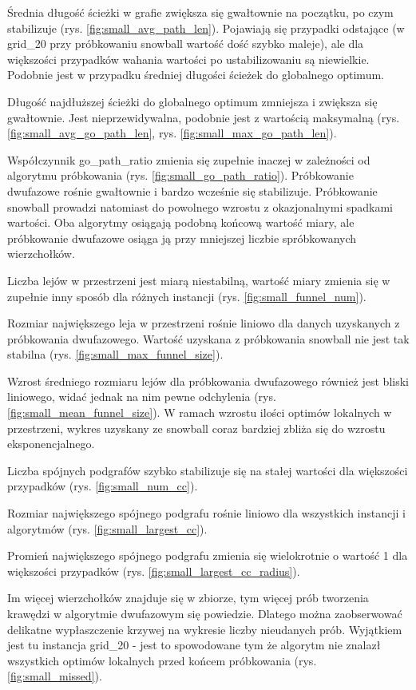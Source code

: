 Średnia długość ścieżki w grafie zwiększa się gwałtownie na początku, po czym stabilizuje (rys. \ref{fig:small_avg_path_len}).
Pojawiają się przypadki odstające (w grid\_20 przy próbkowaniu snowball wartość dość szybko maleje),
ale dla większości przypadków wahania wartości po ustabilizowaniu są niewielkie.
Podobnie jest w przypadku średniej długości ścieżek do globalnego optimum.

Długość najdłuższej ścieżki do globalnego optimum zmniejsza i zwiększa się gwałtownie.
Jest nieprzewidywalna, podobnie jest z wartością maksymalną (rys. \ref{fig:small_avg_go_path_len}, rys. \ref{fig:small_max_go_path_len}).

Współczynnik go\_path\_ratio zmienia się zupełnie inaczej w zależności od algorytmu próbkowania (rys. \ref{fig:small_go_path_ratio}).
Próbkowanie dwufazowe rośnie gwałtownie i bardzo wcześnie się stabilizuje.
Próbkowanie snowball prowadzi natomiast do powolnego wzrostu z okazjonalnymi spadkami wartości.
Oba algorytmy osiągają podobną końcową wartość miary, ale próbkowanie dwufazowe osiąga ją przy mniejszej
liczbie spróbkowanych wierzchołków.

Liczba lejów w przestrzeni jest miarą niestabilną, wartość miary zmienia się w zupełnie inny sposób
dla różnych instancji (rys. \ref{fig:small_funnel_num}).

Rozmiar największego leja w przestrzeni rośnie liniowo dla danych uzyskanych z próbkowania
dwufazowego. Wartość uzyskana z próbkowania snowball nie jest tak stabilna (rys. \ref{fig:small_max_funnel_size}).

Wzrost średniego rozmiaru lejów dla próbkowania dwufazowego również jest bliski liniowego,
widać jednak na nim pewne odchylenia (rys. \ref{fig:small_mean_funnel_size}). W ramach wzrostu ilości optimów lokalnych w przestrzeni,
wykres uzyskany ze snowball coraz bardziej zbliża się do wzrostu eksponencjalnego.

Liczba spójnych podgrafów szybko stabilizuje się na stałej wartości dla większości przypadków (rys. \ref{fig:small_num_cc}).

Rozmiar największego spójnego podgrafu rośnie liniowo dla wszystkich instancji i algorytmów (rys. \ref{fig:small_largest_cc}).

Promień największego spójnego podgrafu zmienia się wielokrotnie o wartość 1 dla większości przypadków (rys. \ref{fig:small_largest_cc_radius}).

Im więcej wierzchołków znajduje się w zbiorze, tym więcej prób tworzenia krawędzi w algorytmie dwufazowym
się powiedzie. Dlatego można zaobserwować delikatne wypłaszczenie krzywej na wykresie liczby nieudanych prób.
Wyjątkiem jest tu instancja grid\_20  - jest to spowodowane tym że algorytm nie znalazł wszystkich optimów
lokalnych przed końcem próbkowania (rys. \ref{fig:small_missed}).

